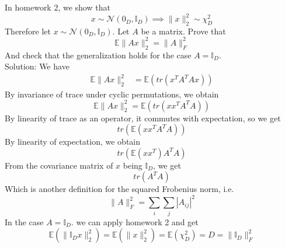 \documentclass[12pt]{article}
\begin{document}
In homework 2, we show that
\[ x \sim \mathcal{N}(0_D, \mathbb{I}_D) \implies \|x\|_2^2 \sim \chi_D^2 \]
Therefore let $x \sim \mathcal{N}(0_D, \mathbb{I}_D)$. Let $A$ be a matrix. Prove that
\[ \mathbb{E} \|Ax\|_2^2 = \|A\|_F^2 \]
And check that the generalization holds for the case $A = \mathbb{I}_D$. \\

Solution: We have
\begin{align*}
\mathbb{E}\|Ax \|_2^2 &= \mathbb{E}(tr(x^T A^T A x))
\end{align*}
By invariance of trace under cyclic permutations, we obtain
\[ \mathbb{E}\|Ax \|_2^2 = \mathbb{E}(tr(xx^T A^T A)) \]
By linearity of trace as an operator, it commutes with expectation, so we get
\[ tr(\mathbb{E}(xx^T A^T A)) \]
By linearity of expectation, we obtain
\[ tr(\mathbb{E}(xx^T) A^T A) \]
From the covariance matrix of $x$ being $\mathbb{I}_D$, we get
\[ tr(A^T A) \]
Which is another definition for the squared Frobenius norm, i.e.
\[ \|A\|_F^2 = \sum\limits_{i}\sum\limits_{j} |A_{ij}|^2 \]
In the case $A = \mathbb{I}_D$. we can apply homework 2 and get
\[ \mathbb{E}(\|\mathbb{I}_Dx\|_2^2) = \mathbb{E}(\|x\|_2^2) = \mathbb{E}(\chi_D^2) = D = \|\mathbb{I}_D\|_F^2 \]
\end{document}
